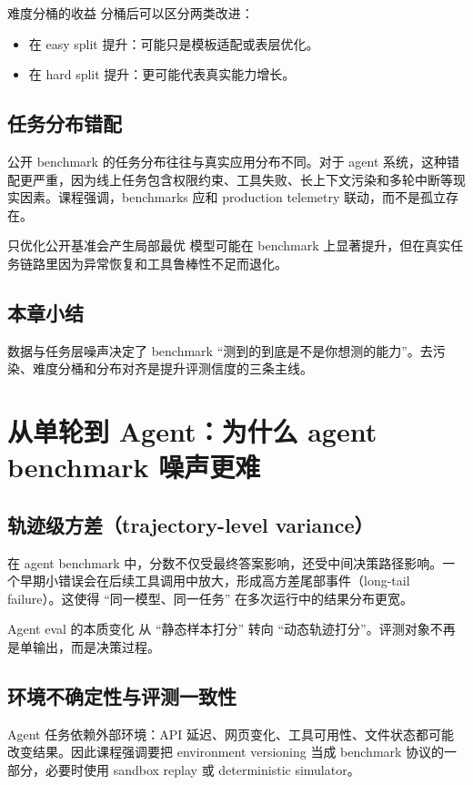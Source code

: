 \documentclass[a4paper]{article}
\begin{document}
\begin{knowledgebox}{难度分桶的收益}
分桶后可以区分两类改进：
\begin{itemize}
    \item 在 easy split 提升：可能只是模板适配或表层优化。
    \item 在 hard split 提升：更可能代表真实能力增长。
\end{itemize}
\end{knowledgebox}

\subsection{任务分布错配}
公开 benchmark 的任务分布往往与真实应用分布不同。对于 agent 系统，这种错配更严重，因为线上任务包含权限约束、工具失败、长上下文污染和多轮中断等现实因素。课程强调，benchmarks 应和 production telemetry 联动，而不是孤立存在。

\begin{warningbox}{只优化公开基准会产生局部最优}
模型可能在 benchmark 上显著提升，但在真实任务链路里因为异常恢复和工具鲁棒性不足而退化。
\end{warningbox}

\subsection{本章小结}
数据与任务层噪声决定了 benchmark ``测到的到底是不是你想测的能力''。去污染、难度分桶和分布对齐是提升评测信度的三条主线。

\section{从单轮到 Agent：为什么 agent benchmark 噪声更难}

\subsection{轨迹级方差（trajectory-level variance）}
在 agent benchmark 中，分数不仅受最终答案影响，还受中间决策路径影响。一个早期小错误会在后续工具调用中放大，形成高方差尾部事件（long-tail failure）。这使得 ``同一模型、同一任务'' 在多次运行中的结果分布更宽。

\begin{importantbox}{Agent eval 的本质变化}
从 ``静态样本打分'' 转向 ``动态轨迹打分''。评测对象不再是单输出，而是决策过程。
\end{importantbox}

\subsection{环境不确定性与评测一致性}
Agent 任务依赖外部环境：API 延迟、网页变化、工具可用性、文件状态都可能改变结果。因此课程强调要把 environment versioning 当成 benchmark 协议的一部分，必要时使用 sandbox replay 或 deterministic simulator。
\end{document}
